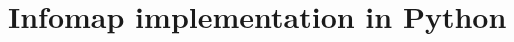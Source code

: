 \hypertarget{pyinfomap}{\section{Infomap implementation in
Python}\label{pyinfomap}}


\protect\hyperlink{pyinfomap}{}
